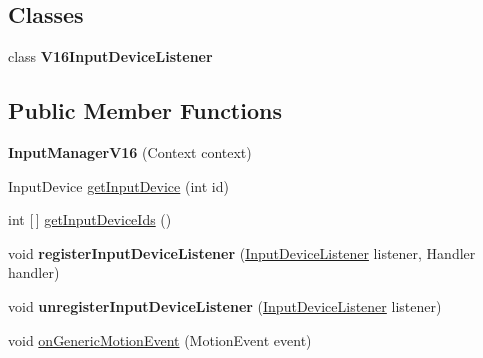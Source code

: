 \subsection*{Classes}
\begin{DoxyCompactItemize}
\item 
class {\bfseries V16\+Input\+Device\+Listener}
\end{DoxyCompactItemize}
\subsection*{Public Member Functions}
\begin{DoxyCompactItemize}
\item 
\mbox{\label{classorg_1_1cocos2dx_1_1lib_1_1inputmanagercompat_1_1InputManagerV16_a670064e86bdd3a785c5693bdf3cfaa1a}} 
{\bfseries Input\+Manager\+V16} (Context context)
\item 
Input\+Device \hyperlink{classorg_1_1cocos2dx_1_1lib_1_1inputmanagercompat_1_1InputManagerV16_ab7a4f0ce39114a0c891c2c6642f61e4c}{get\+Input\+Device} (int id)
\item 
int \mbox{[}$\,$\mbox{]} \hyperlink{classorg_1_1cocos2dx_1_1lib_1_1inputmanagercompat_1_1InputManagerV16_a41ff1ae73d68436be41859a4ac5f2e62}{get\+Input\+Device\+Ids} ()
\item 
\mbox{\label{classorg_1_1cocos2dx_1_1lib_1_1inputmanagercompat_1_1InputManagerV16_a4584703fef7712ae9dbaa12a1f4a679d}} 
void {\bfseries register\+Input\+Device\+Listener} (\hyperlink{interfaceorg_1_1cocos2dx_1_1lib_1_1inputmanagercompat_1_1InputManagerCompat_1_1InputDeviceListener}{Input\+Device\+Listener} listener, Handler handler)
\item 
\mbox{\label{classorg_1_1cocos2dx_1_1lib_1_1inputmanagercompat_1_1InputManagerV16_a97aa2ca35f221a36ae04f6710e54a435}} 
void {\bfseries unregister\+Input\+Device\+Listener} (\hyperlink{interfaceorg_1_1cocos2dx_1_1lib_1_1inputmanagercompat_1_1InputManagerCompat_1_1InputDeviceListener}{Input\+Device\+Listener} listener)
\item 
void \hyperlink{classorg_1_1cocos2dx_1_1lib_1_1inputmanagercompat_1_1InputManagerV16_ab72ef0c7bf1fcc4cbd2f609d2e47f745}{on\+Generic\+Motion\+Event} (Motion\+Event event)

\end{DoxyCompactItemize}
